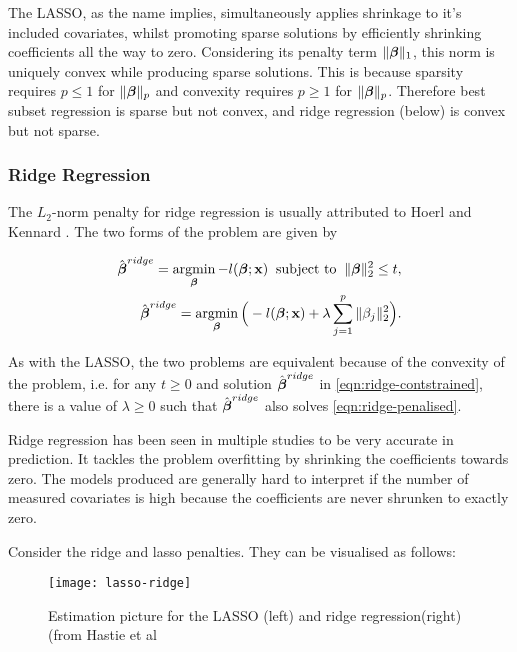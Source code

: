 The LASSO, as the name implies, simultaneously applies shrinkage to it's included covariates, whilst promoting sparse solutions by efficiently shrinking coefficients all the way to zero. Considering its penalty term $\Vert\boldsymbol{\beta}\Vert_1$, this norm is uniquely convex while producing sparse solutions. This is because sparsity requires $p\leq1$ for $\Vert\boldsymbol{\beta}\Vert_p$ and convexity requires $p\geq1$ for $\Vert\boldsymbol{\beta}\Vert_p$. Therefore best subset regression is sparse but not convex, and ridge regression (below) is convex but not sparse.

\subsubsection{Ridge Regression}

The $L_2$-norm penalty for ridge regression is usually attributed to Hoerl and Kennard . The two forms of the problem are given by

\begin{align}
    \hat{\boldsymbol{\beta}}^{ridge} =\operatorname*{argmin}_{\boldsymbol{\beta}} -l(\boldsymbol{\beta};\textbf{x})\;\;\textrm{subject to}\;\;\Vert\boldsymbol{\beta}\Vert_2^2\leq t,\label{eqn:ridge-contstrained}\\
    \hat{\boldsymbol{\beta}}^{ridge} = \operatorname*{argmin}_{\boldsymbol{\beta}}\Big(-l(\boldsymbol{\beta};\textbf{x})+\lambda\sum_{j=1}^p\Vert\beta_j\Vert_2^2\Big)\label{eqn:ridge-penalised}.
\end{align}

As with the LASSO, the two problems are equivalent because of the convexity of the problem, i.e. for any $t\geq 0$ and solution $\hat{\boldsymbol{\beta}}^{ridge}$ in \cref{eqn:ridge-contstrained}, there is a value of $\lambda\geq0$ such that $\hat{\boldsymbol{\beta}}^{ridge}$ also solves \cref{eqn:ridge-penalised}.

Ridge regression has been seen in multiple studies to be very accurate in prediction. It tackles the problem overfitting by shrinking the coefficients towards zero. The models produced are generally hard to interpret if the number of measured covariates is high because the coefficients are never shrunken to exactly zero.

Consider the ridge and lasso penalties. They can be visualised as follows:

\begin{figure}[h!]
  \texttt{[image: lasso-ridge]}
  \caption{Estimation picture for the LASSO (left) and ridge regression(right) (from Hastie et al }
  \label{fig:lasso-ridge}
\end{figure}

